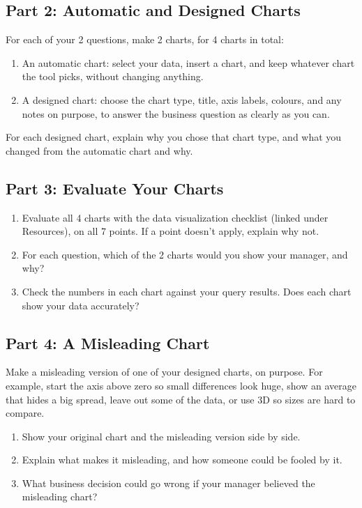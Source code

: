 \documentclass[12pt]{article}
\begin{document}
\subsection*{Part 2: Automatic and Designed Charts}
For each of your 2 questions, make 2 charts, for 4 charts in total:
\begin{enumerate}
    \item An automatic chart: select your data, insert a chart, and keep whatever chart the tool picks, without changing anything.
    \item A designed chart: choose the chart type, title, axis labels, colours, and any notes on purpose, to answer the business question as clearly as you can.
\end{enumerate}
For each designed chart, explain why you chose that chart type, and what you changed from the automatic chart and why.

\subsection*{Part 3: Evaluate Your Charts}
\begin{enumerate}
    \item Evaluate all 4 charts with the data visualization checklist (linked under Resources), on all 7 points. If a point doesn't apply, explain why not.
    \item For each question, which of the 2 charts would you show your manager, and why?
    \item Check the numbers in each chart against your query results. Does each chart show your data accurately?
\end{enumerate}

\subsection*{Part 4: A Misleading Chart}
Make a misleading version of one of your designed charts, on purpose. For example, start the axis above zero so small differences look huge, show an average that hides a big spread, leave out some of the data, or use 3D so sizes are hard to compare.
\begin{enumerate}
    \item Show your original chart and the misleading version side by side.
    \item Explain what makes it misleading, and how someone could be fooled by it.
    \item What business decision could go wrong if your manager believed the misleading chart?
\end{enumerate}
\end{document}
